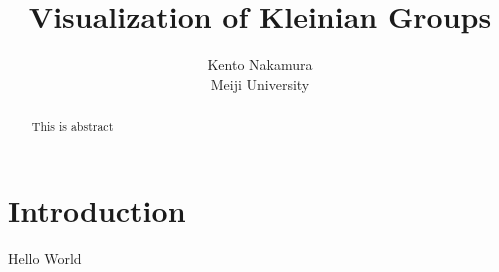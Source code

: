 \documentclass[uplatex, dvipdfmx]{article}
\title{ Visualization of Kleinian Groups }
\author{ Kento Nakamura\\
Meiji University\\
}
\date{}
\begin{document}
\maketitle

\begin{abstract}
This is abstract
\end{abstract}

\clearpage

\tableofcontents

\clearpage

\section{Introduction}
Hello World

\printbibliography
\end{document}
